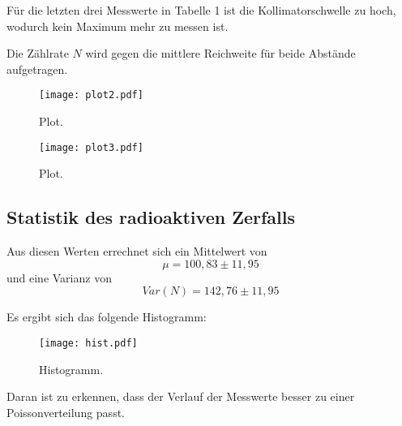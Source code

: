 Für die letzten drei Messwerte in Tabelle 1 ist die Kollimatorschwelle zu hoch, wodurch kein Maximum mehr zu messen ist.

Die Zählrate $N$ wird gegen die mittlere Reichweite für beide Abstände aufgetragen.

\begin{figure}[H]
  \centering
  \texttt{[image: plot2.pdf]}
  \caption{Plot.}
  \label{fig:plot}
\end{figure}


\begin{figure}[H]
  \centering
  \texttt{[image: plot3.pdf]}
  \caption{Plot.}
  \label{fig:plot}
\end{figure}





\subsection{Statistik des radioaktiven Zerfalls}
Aus diesen Werten errechnet sich ein Mittelwert von
\begin{equation*}
  \mu = 100,83 \pm 11,95
\end{equation*}
und eine Varianz von
\begin{equation*}
  Var(N) = 142,76 \pm 11,95
\end{equation*}

Es ergibt sich das folgende Histogramm:
\begin{figure}[H]
  \centering
  \texttt{[image: hist.pdf]}
  \caption{Histogramm.}
  \label{fig:hist}
\end{figure}

Daran ist zu erkennen, dass der Verlauf der Messwerte besser zu einer Poissonverteilung passt.
